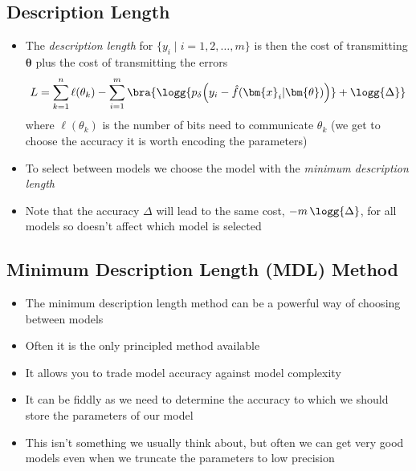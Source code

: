 \begin{slide}
\section{Description Length}

\begin{PauseHighLight}
  \begin{itemize}
  \item The \emph{description length} for $\{y_i \mid i=1,2,\ldots,m\}$ is
    then the cost of transmitting $\bm{\theta}$ plus the cost of
    transmitting the errors
    \begin{align*}
      L = \sum_{k=1}^n \ell(\theta_k) - \sum_{i=1}^m \bra{\logg{\strut p_\delta\!\left(y_i -
      \hat{f}(\bm{x}_i|\bm{\theta})\right)} + \logg{\Delta}}
    \end{align*}
    where $\ell(\theta_k) $ is the number of bits need to communicate
    $\theta_k$ (we get to choose the accuracy it is worth encoding the
    parameters)\pause
  \item To select between models we choose the model with the
    \emph{minimum description length}\pause
  \item Note that the accuracy $\Delta$ will lead to the same cost,
    $-m\,\logg{\Delta}$, for all models so doesn't affect which model is selected\pause
  \end{itemize}
\end{PauseHighLight}

\end{slide}


\begin{slide}
\section[-1]{Minimum Description Length (MDL) Method}

\begin{PauseHighLight}
  \begin{itemize}
  \item The minimum description length method can be a powerful way of
    choosing between models\pause
  \item Often it is the only principled method available\pause
  \item It allows you to trade model accuracy against model
    complexity\pause
  \item It can be fiddly as we need to determine the accuracy to which
    we should store the parameters of our model\pause
  \item This isn't something we usually think about, but often we can
    get very good models  even when we truncate the parameters to low
    precision\pause
  \end{itemize}
\end{PauseHighLight}

\end{slide}



